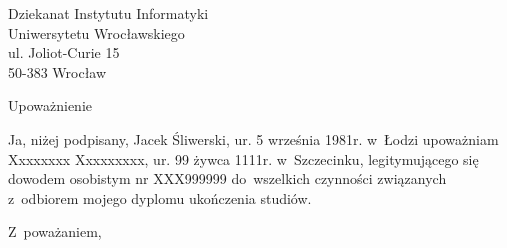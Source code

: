 \documentclass[12pt,firstpage]{umcsletter}
\date{Drezno, 23 lutego 2007}
\begin{document}
\begin{letter}{Dziekanat Instytutu Informatyki\\
               Uniwersytetu Wrocławskiego \\
               ul. Joliot-Curie 15 \\
               50-383 Wrocław}

\address{Jacek Śliwerski\\
         Wartburgstr. 28\\
         01309 Dresden\\
         Niemcy}

\opening{Upoważnienie}

Ja, niżej podpisany, Jacek Śliwerski, ur. 5 września 1981r. w~Łodzi
upoważniam Xxxxxxxx Xxxxxxxxx, ur. 99 żywca 1111r.
w~Szczecinku, legitymującego się dowodem osobistym nr XXX999999
do~wszelkich czynności związanych z~odbiorem mojego dyplomu ukończenia
studiów.

\closing{Z~poważaniem,}

\end{letter}
\end{document}
